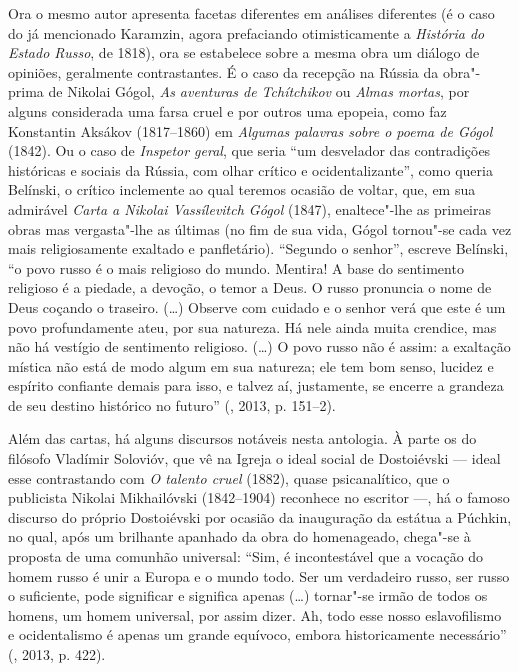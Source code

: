{Ora o mesmo autor apresenta facetas diferentes em análises diferentes (é o caso do já mencionado Karamzin, agora prefaciando otimisticamente a
\emph{História do Estado Russo}, de 1818), ora se estabelece sobre a
mesma obra um diálogo de opiniões, geralmente contrastantes. É o caso da
recepção na Rússia da obra"-prima de Nikolai Gógol, \emph{As aventuras de Tchítchikov} ou \emph{Almas mortas}, por alguns considerada uma
farsa cruel e por outros uma epopeia, como faz Konstantin Aksákov (1817--1860) em
\emph{Algumas palavras sobre o poema de Gógol} (1842). Ou o caso de \emph{Inspetor geral}, que seria ``um desvelador das contradições históricas e
sociais da Rússia, com olhar crítico e ocidentalizante'', como queria
Belínski, o crítico inclemente ao qual teremos ocasião de
voltar, que, em sua admirável \emph{Carta a Nikolai Vassílevitch Gógol} (1847), enaltece"-lhe as primeiras obras mas vergasta"-lhe as últimas (no
fim de sua vida, Gógol tornou"-se cada vez mais religiosamente exaltado
e panfletário). ``Segundo o senhor'', escreve Belínski, ``o povo russo
é o mais religioso do mundo. Mentira! A base do sentimento religioso é a
piedade, a devoção, o temor a Deus. O russo pronuncia o nome de Deus
coçando o traseiro. (\ldots{}) Observe com cuidado e o senhor verá que este é
um povo profundamente ateu, por sua natureza. Há nele ainda muita
crendice, mas não há vestígio de sentimento religioso. (\ldots{}) O povo
russo não é assim: a exaltação mística não está de modo algum em sua
natureza; ele tem bom senso, lucidez e espírito confiante demais para
isso, e talvez aí, justamente, se encerre a grandeza de seu destino
histórico no futuro'' (, 2013, p. 151--2).

Além das cartas, há alguns discursos notáveis nesta antologia. À parte
os do filósofo Vladímir Solovióv, que vê na Igreja o ideal social de
Dostoiévski --- ideal esse contrastando com \emph{O talento
cruel} (1882), quase psicanalítico, que o publicista Nikolai Mikhailóvski (1842--1904) reconhece
no escritor ---, há o famoso discurso do próprio Dostoiévski por ocasião da
inauguração da estátua a Púchkin, no qual, após um brilhante
apanhado da obra do homenageado, chega"-se à proposta de uma comunhão
universal: ``Sim, é incontestável que a vocação do homem russo é unir a
Europa e o mundo todo. Ser um verdadeiro russo, ser russo o suficiente,
pode significar e significa apenas (\ldots{}) tornar"-se irmão de todos os
homens, um homem universal, por assim dizer. Ah, todo esse nosso
eslavofilismo e ocidentalismo é apenas um grande equívoco, embora
historicamente necessário'' (, 2013, p. 422).

}
